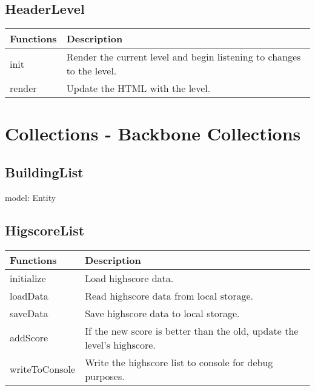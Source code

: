 \subsection*{HeaderLevel}

	\begin{table}[H]
	\begin{tabular}{p{4cm} | p{8cm} }
	\hline
	\rowcolor{gray}
	Functions & Description \\ \hline
	init & Render the current level and begin listening to changes to the level. \\ \hline
	render & Update the HTML with the level.  \\ \hline
	\end{tabular}
	\end{table}

\clearpage

\section{Collections - Backbone Collections}
	
\subsection*{BuildingList}

	model: Entity

\subsection*{HigscoreList}

	\begin{table}[H]
	\begin{tabular}{p{4cm} | p{8cm} }
	\hline
	\rowcolor{gray}
	Functions & Description \\ \hline
	initialize & Load highscore data. \\ \hline
	loadData & Read highscore data from local storage. \\ \hline
	saveData & Save highscore data to local storage. \\ \hline
	addScore & If the new score is better than the old, update the level's highscore. \\ \hline
	writeToConsole & Write the highscore list to console for debug purposes. \\ \hline

	\end{tabular}
	\end{table}

